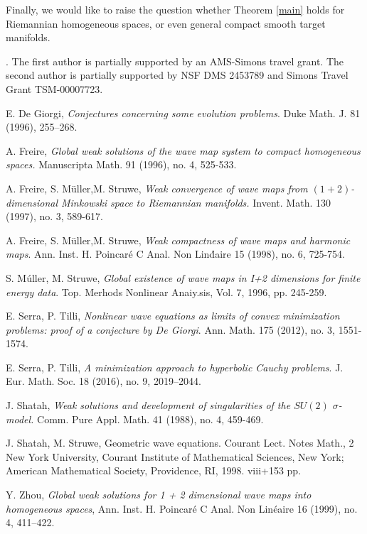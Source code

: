 \documentclass[12pt,twoside,reqno]{amsart}
\theoremstyle{definition}              %
\theoremstyle{remark}                  %
\renewcommand{\1}{\mathbbm{1}}                                      %
\numberwithin{equation}{section}
\numberwithin{definition}{section}
\numberwithin{theorem}{section}
\numberwithin{remark}{section}
\begin{document}
\bigskip
Finally, we would like to raise the question whether
Theorem \ref{main} holds for Riemannian homogeneous
spaces, or even general compact smooth target manifolds.

\bigskip
{}. The first author is partially supported by an AMS-Simons travel grant. The second author is partially supported by NSF DMS 2453789 and Simons Travel Grant TSM-00007723.


\begin{thebibliography}{}

 E. De Giorgi, {\it Conjectures concerning some evolution problems}. Duke Math. J. 81 (1996), 255–268.

 A. Freire, {\em Global weak solutions of the wave map system to compact homogeneous spaces.}
Manuscripta Math. 91 (1996), no. 4, 525-533.


 A. Freire, S. M\"uller,M. Struwe,
{\em Weak convergence of wave maps from  $(1+2)$-dimensional Minkowski space to Riemannian manifolds.}
Invent. Math. 130 (1997), no. 3, 589-617.

 A. Freire, S. M\"uller,M. Struwe,
{\em Weak compactness of wave maps and harmonic maps}.
Ann. Inst. H. Poincar\'e C Anal. Non Lin\'daire 15 (1998), 
no. 6, 725-754.

 S. M\'uller, M. Struwe, 
{\em Global existence of wave maps in I+2 dimensions for finite
energy data}. Top. Merhods Nonlinear Anaiy.sis, Vol. 7, 1996, pp. 245-259.


 E. Serra, P. Tilli,
{\em Nonlinear wave equations as limits of convex minimization problems:
proof of a conjecture by De Giorgi}.
Ann. Math. 175 (2012), no. 3, 1551-1574.

 E. Serra, P. Tilli,
{\em A minimization approach to hyperbolic Cauchy problems}. 
J. Eur. Math. Soc. 18 (2016), no. 9, 2019–2044.

 J. Shatah,  
{\em Weak solutions and development of singularities of the 
$SU(2)$ $\sigma$-model.}
Comm. Pure Appl. Math. 41 (1988), no. 4, 459-469.

 J. Shatah, M. Struwe, 
Geometric wave equations.
Courant Lect. Notes Math., 2
New York University, Courant Institute of Mathematical Sciences, New York; American Mathematical Society, Providence, RI, 1998. viii+153 pp.

 Y. Zhou, {\it Global weak solutions for 1 + 2 dimensional wave maps into homogeneous spaces}, 
Ann. Inst. H. Poincar\'e C Anal. Non Lin\'eaire 16 (1999), 
no. 4, 411–422.
\end{thebibliography}
\end{document}
